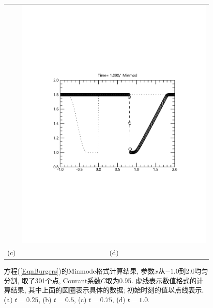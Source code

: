 \documentclass[10.5pt
]{article}
\begin{document}
\begin{figure}[htb]
\begin{center}
\begin{tabular}{cc}
			&
			\includegraphics[width=.45\textwidth]{fig2_1_4}
			\\[-10pt]
			(c) & (d)
		\end{tabular}
	\end{center}
	\caption{%
		方程(\ref{EqnBurgers})的Minmode格式计算结果, 参数$x$从$-1.0$到$2.0$均匀分割, 取了301个点, Courant系数$C$取为0.95. 虚线表示数值格式的计算结果, 其中上面的圆圈表示具体的数据; 初始时刻的值以点线表示. (a) $t=0.25$, (b) $t=0.5$, (c) $t=0.75$, (d) $t=1.0$.
	}
	\label{BurgersM}
\end{figure}
\end{document}
